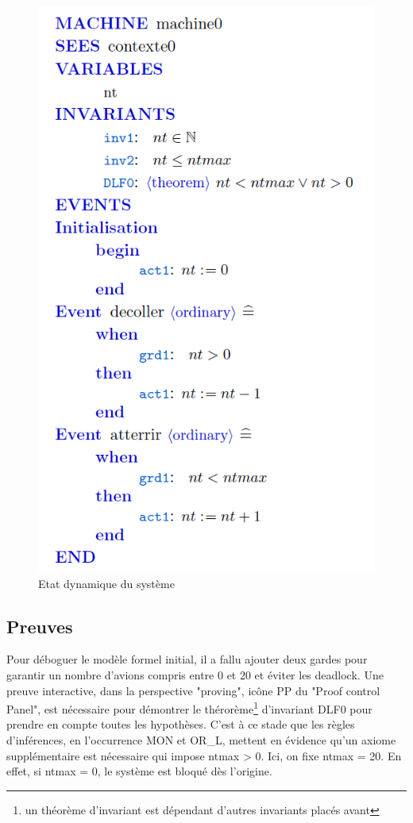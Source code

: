 \begin{figure}[H]
	\begin{center}	
		\includegraphics[scale=1]{images/0/machine0.png}
		\caption{Etat dynamique du système}
		\label{machine0}
	\end{center}
\end{figure}



\subsection{Preuves}
Pour déboguer le modèle formel initial, il a fallu ajouter deux gardes pour garantir un nombre d'avions compris entre 0 et 20 et éviter les deadlock.
Une preuve interactive, dans la perspective "proving", icône PP du "Proof control Panel", est nécessaire pour démontrer le thérorème\footnote{un théorème d'invariant est dépendant d'autres invariants placés avant} d'invariant DLF0 pour prendre en compte toutes les hypothèses. C'est à ce stade que les règles d'inférences, en l'occurrence MON et OR\_L, mettent en évidence qu'un axiome supplémentaire est nécessaire qui impose ntmax > 0. Ici, on fixe ntmax = 20. En effet, si ntmax = 0, le système est bloqué dès l'origine. 

